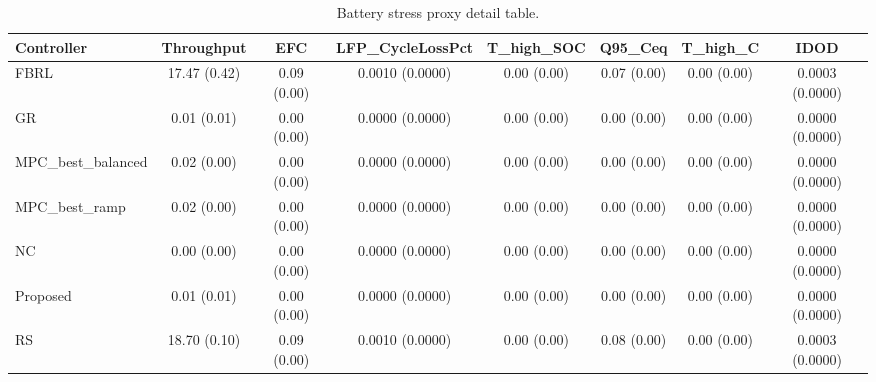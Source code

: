 \begin{table}[t]
\centering
\caption{Battery stress proxy detail table.}
\label{tab:stress_proxy_auto}
\begin{tabular}{lccccccc}
\toprule
Controller & Throughput & EFC & LFP\_CycleLossPct & T\_high\_SOC & Q95\_Ceq & T\_high\_C & IDOD \\
\midrule
FBRL & 17.47 (0.42) & 0.09 (0.00) & 0.0010 (0.0000) & 0.00 (0.00) & 0.07 (0.00) & 0.00 (0.00) & 0.0003 (0.0000) \\
GR & 0.01 (0.01) & 0.00 (0.00) & 0.0000 (0.0000) & 0.00 (0.00) & 0.00 (0.00) & 0.00 (0.00) & 0.0000 (0.0000) \\
MPC\_best\_balanced & 0.02 (0.00) & 0.00 (0.00) & 0.0000 (0.0000) & 0.00 (0.00) & 0.00 (0.00) & 0.00 (0.00) & 0.0000 (0.0000) \\
MPC\_best\_ramp & 0.02 (0.00) & 0.00 (0.00) & 0.0000 (0.0000) & 0.00 (0.00) & 0.00 (0.00) & 0.00 (0.00) & 0.0000 (0.0000) \\
NC & 0.00 (0.00) & 0.00 (0.00) & 0.0000 (0.0000) & 0.00 (0.00) & 0.00 (0.00) & 0.00 (0.00) & 0.0000 (0.0000) \\
Proposed & 0.01 (0.01) & 0.00 (0.00) & 0.0000 (0.0000) & 0.00 (0.00) & 0.00 (0.00) & 0.00 (0.00) & 0.0000 (0.0000) \\
RS & 18.70 (0.10) & 0.09 (0.00) & 0.0010 (0.0000) & 0.00 (0.00) & 0.08 (0.00) & 0.00 (0.00) & 0.0003 (0.0000) \\
\bottomrule
\end{tabular}
\end{table}